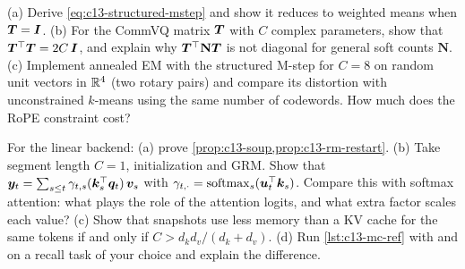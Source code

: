 \begin{exercise}[Structured EM]\label{exr:c13-em}
(a) Derive \eqref{eq:c13-structured-mstep} and show it reduces to weighted means when $\bm{T}=\bm{I}$. (b) For the
CommVQ matrix $\bm{T}$ with $C$ complex parameters, show that $\bm{T}^{\top}\bm{T}=2C\,\bm{I}$, and explain why
$\bm{T}^{\top}\mathbf{N}\bm{T}$ is not diagonal for general soft counts $\mathbf{N}$. (c) Implement annealed EM with the
structured M-step for $C=8$ on random unit vectors in $\mathbb{R}^4$ (two rotary pairs) and compare its distortion
with unconstrained $k$-means using the same number of codewords. How much does the RoPE constraint cost?
\end{exercise}

\begin{exercise}\label{exr:c13-mc}
For the linear backend: (a) prove \cref{prop:c13-soup,prop:c13-rm-restart}. (b) Take segment length
$C=1$,  initialization and GRM. Show that
$\bm{y}_t=\sum_{s\le t}\gamma_{t,s}(\bm{k}_s^{\top}\bm{q}_t)\,\bm{v}_s$ with $\gamma_{t,\cdot}=\operatorname{softmax}_s(\bm{u}_t^{\top}\bm{k}_s)$. Compare
this with softmax attention: what plays the role of the attention logits, and what extra factor scales each
value? (c) Show that snapshots use less memory than a KV cache for the same tokens if and only if
$C>d_kd_v/(d_k+d_v)$. (d) Run \cref{lst:c13-mc-ref} with  and  on a
recall task of your choice and explain the difference.
\end{exercise}
